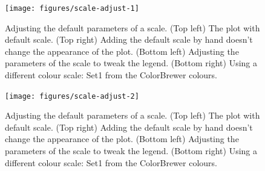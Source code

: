 \begin{figure}
\texttt{[image: figures/scale-adjust-1]} \caption{Adjusting the default parameters of a scale. (Top left) The plot with default scale. (Top right) Adding the default scale by hand doesn't change the appearance of the plot. (Bottom left) Adjusting the parameters of the scale to tweak the legend. (Bottom right) Using a different colour scale: Set1 from the ColorBrewer colours.\label{fig:scale-adjust1}}
\end{figure}

\begin{Shaded}
\begin{Highlighting}[]
\StringTok{ }\NormalTok{()}
\end{Highlighting}
\end{Shaded}

\begin{figure}
\texttt{[image: figures/scale-adjust-2]} \caption{Adjusting the default parameters of a scale. (Top left) The plot with default scale. (Top right) Adding the default scale by hand doesn't change the appearance of the plot. (Bottom left) Adjusting the parameters of the scale to tweak the legend. (Bottom right) Using a different colour scale: Set1 from the ColorBrewer colours.\label{fig:scale-adjust2}}
\end{figure}

\begin{Shaded}
\begin{Highlighting}[]

\StringTok{ }\NormalTok{(}\NormalTok{, }
    \NormalTok{(}\NormalTok{, }\NormalTok{, }\NormalTok{, }\NormalTok{), }
    \NormalTok{(}\NormalTok{, }\NormalTok{, }\NormalTok{, }\NormalTok{))}
\end{Highlighting}
\end{Shaded}

